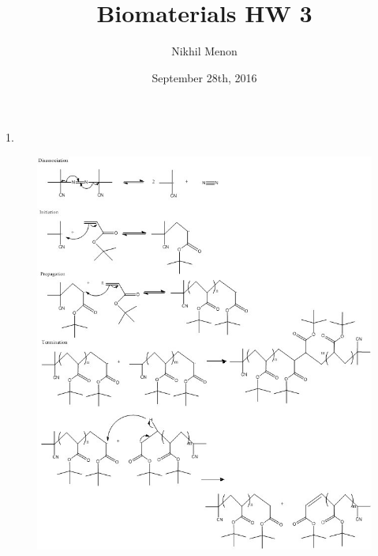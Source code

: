 \documentclass{article}
\title{Biomaterials HW 3}
\author{Nikhil Menon}
\date{September 28th, 2016}
\begin{document}
\maketitle

1. \begin{figure}[h]
  \centering
 \includegraphics[scale=0.8]{P1a.jpg}
\end{figure}
\end{document}
